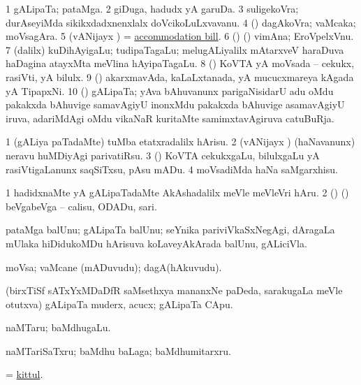 \bentry
{}
\gl{\nA}
\bmng
\bnum
\num{1} gALipaTa; pataMga.  
\num{2} giDuga, hadudx yA garuDa. 
\num{3} suligekoVra; durAseyiMda sikikxdadxnenxlalx doVcikoLuLxvavanu. 
\num{4} (\pArxparx) dagAkoVra; vaMcaka; moVsagAra. 
\num{5} (vANijayx \ashi) = \hyperref{kandict_a.pdf}{A}{accommodation bill}{accommodation bill}. 
\num{6} (\birx) (\ashi) vimAna; EroVpelxVnu. 
\num{7} (\bava dalilx) kuDihAyigaLu; tudipaTagaLu; melugALiyalilx mAtarxveV haraDuva haDagina atayxMta meVlina hAyipaTagaLu. 
\num{8} (\ashi) KoVTA yA moVsada -- cekukx, rasiVti, yA bilulx. 
\num{9} (\ashi) akarxmavAda, kaLaLxtanada, yA mucucxmareya kAgada yA TipapxNi. 
\num{10} (\jAyx) gALipaTa; yAva bAhuvanunx parigaNisidarU adu oMdu pakakxda bAhuvige samavAgiyU inonxMdu pakakxda bAhuvige asamavAgiyU iruva, adariMdAgi oMdu vikaNaR kuritaMte samimxtavAgiruva catuBuRja. 
\enum
\emng
\eentry

\bentry
{}
\gl{\sakirx}
\bmng
\bnum
\num{1} (gALiya paTadaMte) tuMba etatxradalilx hArisu. 
\num{2} (vANijayx \ashi) (haNavanunx) neravu huMDiyAgi parivatiRsu. 
\num{3} (\ashi) KoVTA cekukxgaLu, bilulxgaLu yA rasiVtigaLanunx saqSiTxsu, pAsu mADu. 
\num{4} moVsadiMda haNa saMgarxhisu. 
\enum
\emng

\noindent
\gl{\akirx}
\bmng
\bnum
\num{1} hadidxnaMte yA gALipaTadaMte AkAshadalilx meVle meVleVri hAru. 
\num{2} (\ame) (\AmA) beVgabeVga -- calisu, ODADu, sari. 
\enum
\emng
\eentry

\bentry
{}
\gl{\nA}
\bmng
pataMga balUnu; gALipaTa balUnu; seYnika pariviVkaSxNegAgi, dAragaLa mUlaka hiDidukoMDu hArisuva koLaveyAkArada balUnu, gALiciVla. 
\emng
\eentry

\bentry
{}
\gl{\nA}
\bmng
moVsa; vaMcane (mADuvudu); dagA(hAkuvudu). 
\emng
\eentry

\bentry
{}
\gl{\nA}
\bmng
(birxTiSf sATxYxMDaDfR saMsethxya mananxNe paDeda, sarakugaLa meVle otutxva) gALipaTa muderx, acucx; gALipaTa CApu. 
\emng
\eentry

\bentry
{}
\gl{\nA}
\bmng
naMTaru; baMdhugaLu. 
\emng

\noindent
\gl{\pagu}
\bmng
\hypertarget{kith pagu}{} 
 naMTariSaTxru; baMdhu baLaga; baMdhumitarxru. 
\emng
\eentry

\bentry
{}
\gl{\nA}
\bmng
 = \hyperlink{kittul}{kittul}. 
\emng
\eentry

